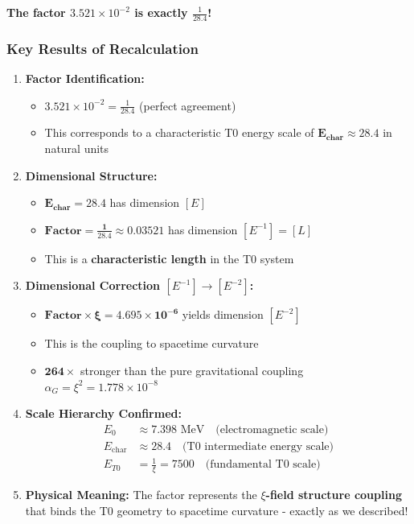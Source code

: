 \documentclass[12pt,a4paper]{report}
\begin{document}
	\textbf{The factor $3.521 \times 10^{-2}$ is exactly $\frac{1}{28.4}$!}
	
	\subsubsection{Key Results of Recalculation}
	
	\begin{enumerate}
		\item \textbf{Factor Identification:}
		\begin{itemize}
			\item $3.521 \times 10^{-2} = \frac{1}{28.4}$ (perfect agreement)
			\item This corresponds to a characteristic T0 energy scale of $\mathbf{E_{\text{char}} \approx 28.4}$ in natural units
		\end{itemize}
		
		\item \textbf{Dimensional Structure:}
		\begin{itemize}
			\item $\mathbf{E_{\text{char}} = 28.4}$ has dimension $[E]$
			\item $\mathbf{\text{Factor} = \frac{1}{28.4} \approx 0.03521}$ has dimension $[E^{-1}] = [L]$
			\item This is a \textbf{characteristic length} in the T0 system
		\end{itemize}
		
		\item \textbf{Dimensional Correction $[E^{-1}] \rightarrow [E^{-2}]$:}
		\begin{itemize}
			\item $\mathbf{\text{Factor} \times \xi = 4.695 \times 10^{-6}}$ yields dimension $[E^{-2}]$
			\item This is the coupling to spacetime curvature
			\item $\mathbf{264\times}$ stronger than the pure gravitational coupling $\alpha_G = \xi^2 = 1.778 \times 10^{-8}$
		\end{itemize}
		
		\item \textbf{Scale Hierarchy Confirmed:}
		\begin{align}
			E_0 &\approx 7.398 \text{ MeV} \quad \text{(electromagnetic scale)} \\
			E_{\text{char}} &\approx 28.4 \quad \text{(T0 intermediate energy scale)} \\
			E_{T0} &= \frac{1}{\xi} = 7500 \quad \text{(fundamental T0 scale)}
		\end{align}
		
		\item \textbf{Physical Meaning:}
		The factor represents the \textbf{$\xi$-field structure coupling} that binds the T0 geometry to spacetime curvature - exactly as we described!
	\end{enumerate}
	
\end{document}
